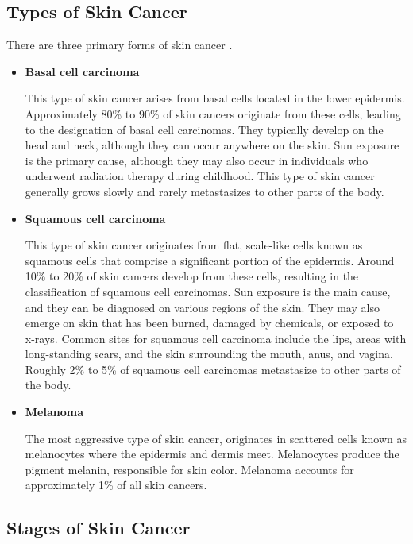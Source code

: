 \subsection{Types of Skin Cancer}

There are three primary forms of skin cancer \cite{BaseCancerKnowledge}.

\begin{itemize}

  \item \textbf{Basal cell carcinoma}

    This type of skin cancer arises from basal cells located in the lower
    epidermis. Approximately 80\% to 90\% of skin cancers originate from
    these cells, leading to the designation of basal cell carcinomas. They
    typically develop on the head and neck, although they can occur anywhere
    on the skin. Sun exposure is the primary cause, although they may also
    occur in individuals who underwent radiation therapy during childhood.
    This type of skin cancer generally grows slowly and rarely metastasizes
    to other parts of the body.

  \item \textbf{Squamous cell carcinoma}

    This type of skin cancer originates from flat, scale-like cells known as
    squamous cells that comprise a significant portion of the epidermis.
    Around 10\% to 20\% of skin cancers develop from these cells, resulting
    in the classification of squamous cell carcinomas. Sun exposure is the
    main cause, and they can be diagnosed on various regions of the skin.
    They may also emerge on skin that has been burned, damaged by chemicals,
    or exposed to x-rays. Common sites for squamous cell carcinoma include
    the lips, areas with long-standing scars, and the skin surrounding the
    mouth, anus, and vagina. Roughly 2\% to 5\% of squamous cell carcinomas
    metastasize to other parts of the body.

  \item \textbf{Melanoma}

    The most aggressive type of skin cancer, originates in scattered cells
    known as melanocytes where the epidermis and dermis meet. Melanocytes
    produce the pigment melanin, responsible for skin color. Melanoma
    accounts for approximately 1\% of all skin cancers.

\end{itemize}

\subsection{Stages of Skin Cancer}

